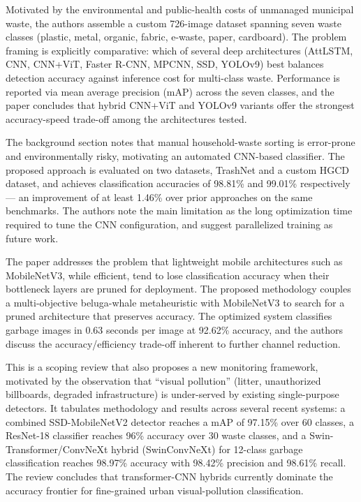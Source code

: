 \documentclass[conference]{IEEEtran}
\begin{document}
\cite{l5multiclasswaste} Motivated by the environmental and public-health costs of unmanaged municipal waste, the authors assemble a custom 726-image dataset spanning seven waste classes (plastic, metal, organic, fabric, e-waste, paper, cardboard). The problem framing is explicitly comparative: which of several deep architectures (AttLSTM, CNN, CNN+ViT, Faster R-CNN, MPCNN, SSD, YOLOv9) best balances detection accuracy against inference cost for multi-class waste. Performance is reported via mean average precision (mAP) across the seven classes, and the paper concludes that hybrid CNN+ViT and YOLOv9 variants offer the strongest accuracy-speed trade-off among the architectures tested.

\cite{l6householdgarbage} The background section notes that manual household-waste sorting is error-prone and environmentally risky, motivating an automated CNN-based classifier. The proposed approach is evaluated on two datasets, TrashNet and a custom HGCD dataset, and achieves classification accuracies of 98.81\% and 99.01\% respectively --- an improvement of at least 1.46\% over prior approaches on the same benchmarks. The authors note the main limitation as the long optimization time required to tune the CNN configuration, and suggest parallelized training as future work.

\cite{l7belugawaste} The paper addresses the problem that lightweight mobile architectures such as MobileNetV3, while efficient, tend to lose classification accuracy when their bottleneck layers are pruned for deployment. The proposed methodology couples a multi-objective beluga-whale metaheuristic with MobileNetV3 to search for a pruned architecture that preserves accuracy. The optimized system classifies garbage images in 0.63 seconds per image at 92.62\% accuracy, and the authors discuss the accuracy/efficiency trade-off inherent to further channel reduction.

\cite{l8visualpollution} This is a scoping review that also proposes a new monitoring framework, motivated by the observation that ``visual pollution'' (litter, unauthorized billboards, degraded infrastructure) is under-served by existing single-purpose detectors. It tabulates methodology and results across several recent systems: a combined SSD-MobileNetV2 detector reaches a mAP of 97.15\% over 60 classes, a ResNet-18 classifier reaches 96\% accuracy over 30 waste classes, and a Swin-Transformer/ConvNeXt hybrid (SwinConvNeXt) for 12-class garbage classification reaches 98.97\% accuracy with 98.42\% precision and 98.61\% recall. The review concludes that transformer-CNN hybrids currently dominate the accuracy frontier for fine-grained urban visual-pollution classification.
\end{document}
